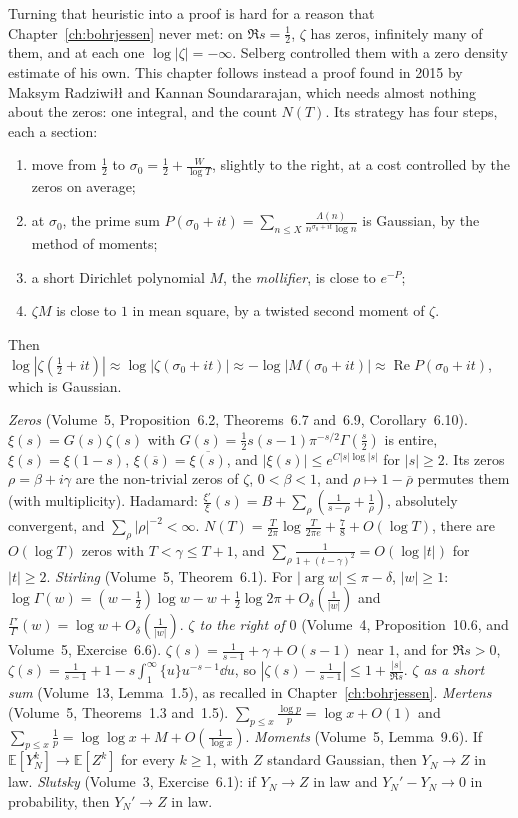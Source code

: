 Turning that heuristic into a proof is hard for a reason that Chapter~\ref{ch:bohrjessen} never met: on $\Re s=\frac12$, $\zeta$ has zeros, infinitely many of them, and at each one $\log|\zeta|=-\infty$. Selberg controlled them with a zero density estimate of his own. This chapter follows instead a proof found in 2015 by Maksym Radziwi\l\l{} and Kannan Soundararajan, which needs almost nothing about the zeros: one integral, and the count $N(T)$. Its strategy has four steps, each a section:
\begin{enumerate}
\item move from $\frac12$ to $\sigma_0=\frac12+\frac W{\log T}$, slightly to the right, at a cost controlled by the zeros on average;
\item at $\sigma_0$, the prime sum $P(\sigma_0+it)=\sum_{n\le X}\frac{\Lambda(n)}{n^{\sigma_0+it}\log n}$ is Gaussian, by the method of moments;
\item a short Dirichlet polynomial $M$, the \emph{mollifier}, is close to $e^{-P}$;
\item $\zeta M$ is close to $1$ in mean square, by a twisted second moment of $\zeta$.
\end{enumerate}
Then $\log|\zeta(\frac12+it)|\approx\log|\zeta(\sigma_0+it)|\approx-\log|M(\sigma_0+it)|\approx\operatorname{Re}P(\sigma_0+it)$, which is Gaussian.

\begin{reminder}
\emph{Zeros} (Volume~5, Proposition~6.2, Theorems~6.7 and~6.9, Corollary~6.10). $\xi(s)=G(s)\zeta(s)$ with $G(s)=\frac12s(s-1)\pi^{-s/2}\Gamma(\frac s2)$ is entire, $\xi(s)=\xi(1-s)$, $\xi(\overline s)=\overline{\xi(s)}$, and $|\xi(s)|\le e^{C|s|\log|s|}$ for $|s|\ge2$. Its zeros $\rho=\beta+i\gamma$ are the non-trivial zeros of $\zeta$, $0<\beta<1$, and $\rho\mapsto1-\overline\rho$ permutes them (with multiplicity). Hadamard: $\frac{\xi'}\xi(s)=B+\sum_\rho(\frac1{s-\rho}+\frac1\rho)$, absolutely convergent, and $\sum_\rho|\rho|^{-2}<\infty$. $N(T)=\frac T{2\pi}\log\frac T{2\pi e}+\frac78+O(\log T)$, there are $O(\log T)$ zeros with $T<\gamma\le T+1$, and $\sum_\rho\frac1{1+(t-\gamma)^2}=O(\log|t|)$ for $|t|\ge2$.
\emph{Stirling} (Volume~5, Theorem~6.1). For $|\arg w|\le\pi-\delta$, $|w|\ge1$: $\log\Gamma(w)=(w-\frac12)\log w-w+\frac12\log2\pi+O_\delta(\frac1{|w|})$ and $\frac{\Gamma'}\Gamma(w)=\log w+O_\delta(\frac1{|w|})$.
\emph{$\zeta$ to the right of $0$} (Volume~4, Proposition~10.6, and Volume~5, Exercise~6.6). $\zeta(s)=\frac1{s-1}+\gamma+O(s-1)$ near $1$, and for $\Re s>0$, $\zeta(s)=\frac1{s-1}+1-s\int_1^\infty\{u\}u^{-s-1}\dd u$, so $|\zeta(s)-\frac1{s-1}|\le1+\frac{|s|}{\Re s}$.
\emph{$\zeta$ as a short sum} (Volume~13, Lemma~1.5), as recalled in Chapter~\ref{ch:bohrjessen}.
\emph{Mertens} (Volume~5, Theorems~1.3 and~1.5). $\sum_{p\le x}\frac{\log p}p=\log x+O(1)$ and $\sum_{p\le x}\frac1p=\log\log x+M+O(\frac1{\log x})$.
\emph{Moments} (Volume~5, Lemma~9.6). If $\mathbb E[Y_N^k]\to\mathbb E[Z^k]$ for every $k\ge1$, with $Z$ standard Gaussian, then $Y_N\to Z$ in law. \emph{Slutsky} (Volume~3, Exercise~6.1): if $Y_N\to Z$ in law and $Y_N'-Y_N\to0$ in probability, then $Y_N'\to Z$ in law.
\end{reminder}

